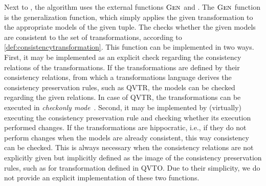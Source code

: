 Next to , the algorithm uses the external functions $\textsc{Gen}_{}$ and .
The $\textsc{Gen}_{}$ function is the generalization function, which simply applies the given transformation to the appropriate models of the given tuple.
The  checks whether the given models are consistent to the set of transformations, according to \autoref{def:consistencytransformation}.
This function can be implemented in two ways.
First, it may be implemented as an explicit check regarding the consistency relations of the transformations.
If the transformations are defined by their consistency relations, from which a transformations language derives the consistency preservation rules, such as \gls{QVTR}, the models can be checked regarding the given relations.
In case of \gls{QVTR}, the transformations can be executed in \emph{checkonly mode}~\cite[Sec. 7.9]{qvt}.
Second, it may be implemented by (virtually) executing the consistency preservation rule and checking whether its execution performed changes.
If the transformations are hippocratic, i.e., if they do not perform changes when the models are already consistent, this way consistency can be checked.
This is always necessary when the consistency relations are not explicitly given but implicitly defined as the image of the consistency preservation rules, such as for transformation defined in \gls{QVTO}.
Due to their simplicity, we do not provide an explicit implementation of these two functions.


